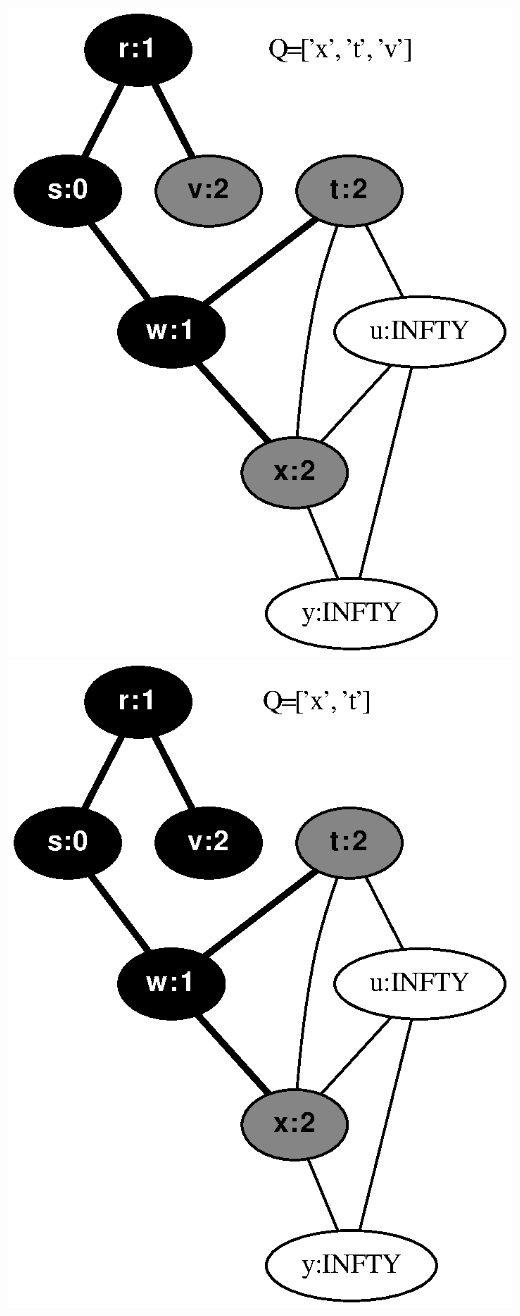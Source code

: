 \documentclass{article}
\begin{document}
\includegraphics[height=.3\textheight]{clrs_example_bfs_03.eps}
\vspace{1em}
\includegraphics[height=.3\textheight]{clrs_example_bfs_04.eps}
\end{document}
